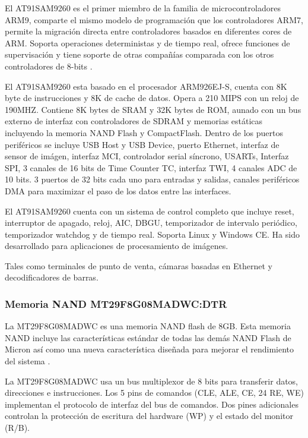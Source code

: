 El AT91SAM9260 es el primer miembro de la familia de microcontroladores
\ac{ARM}9, comparte el mismo modelo de programaci\'{o}n que los controladores
\ac{ARM}7, permite la migraci\'{o}n directa entre controladores basados
en diferentes cores de \ac{ARM}. Soporta operaciones deterministas
y de tiempo real, ofrece funciones de supervisaci\'{o}n y tiene soporte
de otras compañ\'{i}as comparada con los otros controladores de 8-bits
\citet{at91}. 

El AT91SAM9260 esta basado en el procesador ARM926EJ-S, cuenta con
8K byte de instrucciones y 8K de cache de datos. Opera a 210 MIPS
con un reloj de 190MHZ. Contiene 8K bytes de SRAM y 32K bytes de ROM,
aunado con un bus externo de interfaz con controladores de SDRAM y
memorias estáticas incluyendo la memoria NAND Flash y CompactFlash.
Dentro de los puertos perif\'{e}ricos se incluye USB Host y USB Device,
puerto Ethernet, interfaz de sensor de imágen, interfaz MCI, controlador
serial s\'{i}ncrono, USARTs, Interfaz SPI, 3 canales de 16 bits de
Time Counter TC, interfaz TWI, 4 canales ADC de 10 bits. 3 puertos
de 32 bits cada uno para entradas y salidas, canales periféricos DMA
para maximizar el paso de los datos entre las interfaces. 

El AT91SAM9260 cuenta con un sistema de control completo que incluye
reset, interruptor de apagado, reloj, AIC, DBGU, temporizador de intervalo
periódico, temporizador watchdog y de tiempo real. Soporta Linux y
Windows CE. Ha sido desarrollado para aplicaciones de procesamiento
de im\'{a}genes.

Tales como terminales de punto de venta, c\'{a}maras basadas en Ethernet
y decodificadores de barras.


\subsubsection*{Memoria NAND MT29F8G08MADWC:DTR }

La MT29F8G08MADWC es una memoria NAND flash de 8GB. Esta memoria NAND
incluye las características est\'{a}ndar de todas las dem\'{a}s NAND
Flash de Micron así como una nueva característica diseñada para mejorar
el rendimiento del sistema \citet{mt29}. 

La MT29F8G08MADWC usa un bus multiplexor de 8 bits para transferir
datos, direcciones e instrucciones. Los 5 pins de comandos (CLE, ALE,
CE, 24 RE, WE) implementan el protocolo de interfaz del bus de comandos.
Dos pines adicionales controlan la protecci\'{o}n de escritura del
hardware (WP) y el estado del monitor (R/B).


